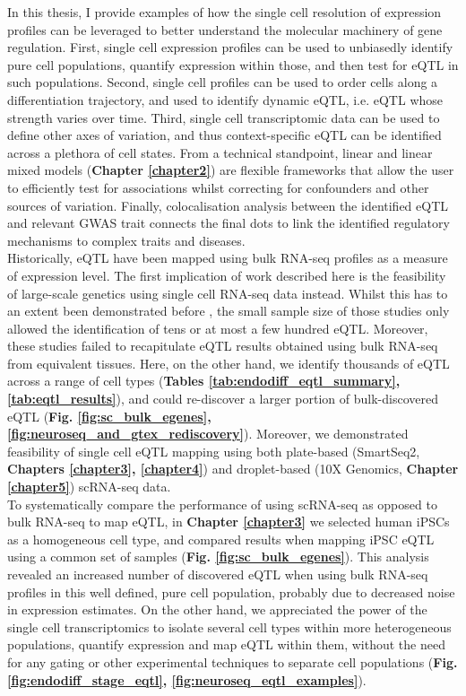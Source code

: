 In this thesis, I provide examples of how the single cell resolution of expression profiles can be leveraged to better understand the molecular machinery of gene regulation.
First, single cell expression profiles can be used to unbiasedly identify pure cell populations, quantify expression within those, and then test for eQTL in such populations.
Second, single cell profiles can be used to order cells along a differentiation trajectory, and used to identify dynamic eQTL, i.e. eQTL whose strength varies over time.
Third, single cell transcriptomic data can be used to define other axes of variation, and thus context-specific eQTL can be identified across a plethora of cell states.
From a technical standpoint, linear and linear mixed models (\textbf{Chapter \ref{chapter2}}) are flexible frameworks that allow the user to efficiently test for associations whilst correcting for confounders and other sources of variation.
Finally, colocalisation analysis between the identified eQTL and relevant GWAS trait connects the final dots to link the identified regulatory mechanisms to complex traits and diseases. \\

Historically, eQTL have been mapped using bulk RNA-seq profiles as a measure of expression level.
The first implication of work described here is the feasibility of large-scale genetics using single cell RNA-seq data instead.
Whilst this has to an extent been demonstrated before \cite{van2018single, kang2018multiplexed}, the small sample size of those studies only allowed the identification of tens or at most a few hundred eQTL.
Moreover, these studies failed to recapitulate eQTL results obtained using bulk RNA-seq from equivalent tissues.
Here, on the other hand, we identify thousands of eQTL across a range of cell types (\textbf{Tables \ref{tab:endodiff_eqtl_summary}, \ref{tab:eqtl_results}}), and could re-discover a larger portion of bulk-discovered eQTL (\textbf{Fig. \ref{fig:sc_bulk_egenes}, \ref{fig:neuroseq_and_gtex_rediscovery}}). 
Moreover, we demonstrated feasibility of single cell eQTL mapping using both plate-based (SmartSeq2, \textbf{Chapters \ref{chapter3}, \ref{chapter4}}) and droplet-based (10X Genomics, \textbf{Chapter \ref{chapter5}}) scRNA-seq data. \\

To systematically compare the performance of using scRNA-seq as opposed to bulk RNA-seq to map eQTL, in \textbf{Chapter \ref{chapter3}} we selected human iPSCs as a homogeneous cell type, and compared results when mapping iPSC eQTL using a common set of samples (\textbf{Fig. \ref{fig:sc_bulk_egenes}}). 
This analysis revealed an increased number of discovered eQTL when using bulk RNA-seq profiles in this well defined, pure cell population, probably due to decreased noise in expression estimates.
On the other hand, we appreciated the power of the single cell transcriptomics to isolate several cell types within more heterogeneous populations, quantify expression and map eQTL within them, without the need for any gating or other experimental techniques to separate cell populations (\textbf{Fig. \ref{fig:endodiff_stage_eqtl}, \ref{fig:neuroseq_eqtl_examples}}). \\

